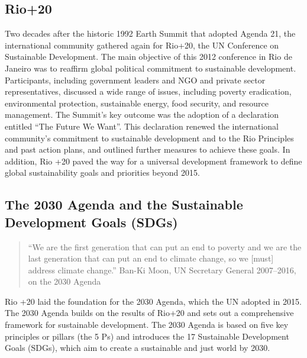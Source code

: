 \documentclass[
  a4paper,
  DIV=11,
  numbers=noendperiod,
  oneside,
  openany]{scrreprt}
\begin{document}
\subsection{Rio+20}\label{rio20}

Two decades after the historic 1992 Earth Summit that adopted Agenda 21,
the international community gathered again for Rio+20, the UN Conference
on Sustainable Development. The main objective of this 2012 conference
in Rio de Janeiro was to reaffirm global political commitment to
sustainable development. Participants, including government leaders and
NGO and private sector representatives, discussed a wide range of
issues, including poverty eradication, environmental protection,
sustainable energy, food security, and resource management. The Summit's
key outcome was the adoption of a declaration entitled ``The Future We
Want''. This declaration renewed the international community's
commitment to sustainable development and to the Rio Principles and past
action plans, and outlined further measures to achieve these goals. In
addition, Rio +20 paved the way for a universal development framework to
define global sustainability goals and priorities beyond 2015.

\subsection{The 2030 Agenda and the Sustainable Development Goals
(SDGs)}\label{the-2030-agenda-and-the-sustainable-development-goals-sdgs}

\begin{quote}
``We are the first generation that can put an end to poverty and we are
the last generation that can put an end to climate change, so we
{[}must{]} address climate change.'' Ban-Ki Moon, UN Secretary General
2007--2016, on the 2030 Agenda
\end{quote}

Rio +20 laid the foundation for the 2030 Agenda, which the UN adopted in
2015. The 2030 Agenda builds on the results of Rio+20 and sets out a
comprehensive framework for sustainable development. The 2030 Agenda is
based on five key principles or pillars (the 5 Ps) and introduces the 17
Sustainable Development Goals (SDGs), which aim to create a sustainable
and just world by 2030.
\end{document}
